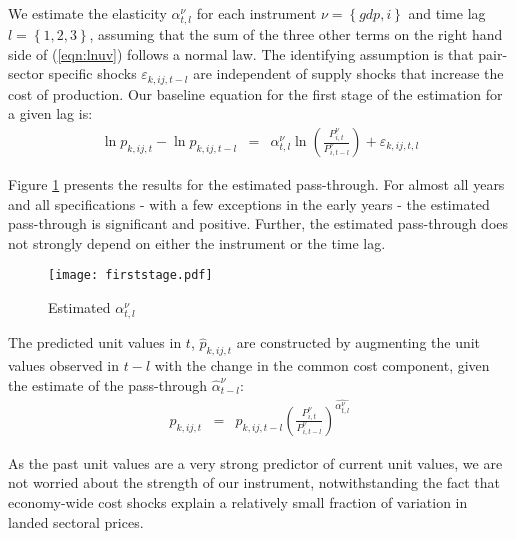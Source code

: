 \documentclass[12pt,twoside,a4paper,notitlepage]{article}
\begin{document}
We estimate the elasticity $\alpha^{\nu}_{t,l}$ for each instrument $\nu=\left\{gdp,i\right\}$ and time lag $l=\left\{1,2,3\right\}$, assuming that the sum of the three other terms on the right hand side of (\ref{eqn:lnuv}) follows a normal law. The identifying assumption is that pair-sector specific shocks $\varepsilon_{k,ij,t-l}$ are independent of supply shocks that increase the cost of production.
Our baseline equation for the first stage of the estimation for a given lag is: 
\begin{eqnarray}
\ln{p}_{k,ij,t}-\ln{p}_{k,ij,t-l}&=&\alpha^\nu_{t,l}\ln \left(\frac{P_{i,t}^{\nu}}{P_{i,t-l}^{\nu}}\right)+\varepsilon_{k,ij,t,l}\label{eqn:passthru}
\end{eqnarray} 	

Figure \ref{fig:firststage} presents the results for the estimated pass-through. 
For almost all years and all specifications - with a few exceptions in the early years - the estimated pass-through is significant and positive.  Further, the estimated pass-through does not strongly depend on either the instrument or the time lag. 
\begin{figure}[H]
\caption{Estimated $\alpha^\nu_{t,l}$}
\texttt{[image: firststage.pdf]}
\label{fig:firststage}
\end{figure}

The predicted unit values in $t$, $\hat{p}_{k,ij,t}$ are constructed by augmenting the unit values observed in $t-l$ with the change in the common cost component, given the estimate of the pass-through $\hat{\alpha}^\nu_{t-l}$:
\begin{eqnarray}
\hat{p}_{k,ij,t}&=&{p}_{k,ij,t-l}\left(\frac{P^\nu_{i,t}}{P^\nu_{i,t-l}}\right)^{\hat{\alpha^\nu_{t,l}}}\label{eqn:uvpred}
\end{eqnarray}

As the past unit values are a very strong predictor of current unit values, we are not worried about the strength of our instrument, notwithstanding the fact that economy-wide cost shocks explain a relatively small fraction of variation in landed sectoral prices.
\end{document}
